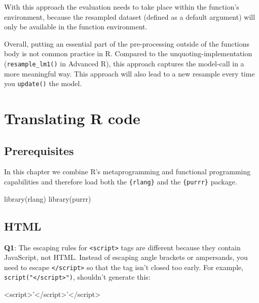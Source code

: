\documentclass[
]{krantz}
\makeatletter
\newenvironment{Shaded}{\begin{snugshade}}{\end{snugshade}}
\newcommand{\KeywordTok}[1]{\textcolor[rgb]{0.13,0.29,0.53}{\textbf{#1}}}
\newcommand{\NormalTok}[1]{#1}
\newcommand{\StringTok}[1]{\textcolor[rgb]{0.31,0.60,0.02}{#1}}
\newenvironment{kframe}{%
\medskip{}
\setlength{\fboxsep}{.8em}
 \def\at@end@of@kframe{}%
 \ifinner\ifhmode%
  \def\at@end@of@kframe{\end{minipage}}%
  \begin{minipage}{\columnwidth}%
 \fi\fi%
 \def\FrameCommand##1{\hskip\@totalleftmargin \hskip-\fboxsep
 \colorbox{shadecolor}{##1}\hskip-\fboxsep
     \hskip-\linewidth \hskip-\@totalleftmargin \hskip\columnwidth}%
 \MakeFramed {\advance\hsize-\width
   \@totalleftmargin\z@ \linewidth\hsize
   \@setminipage}}%
 {\par\unskip\endMakeFramed%
 \at@end@of@kframe}
\renewenvironment{Shaded}{\begin{kframe}}{\end{kframe}}
\renewcommand{\KeywordTok} [1]{\textcolor[rgb]{0.00,0.44,0.13}{{#1}}}
\renewcommand{\StringTok}  [1]{\textcolor[rgb]{0.25,0.44,0.63}{{#1}}}
\renewcommand{\NormalTok}  [1]{{#1}}
\makeatother
\begin{document}
With this approach the evaluation needs to take place within the function's environment, because the resampled dataset (defined as a default argument) will only be available in the function environment.

Overall, putting an essential part of the pre-processing outside of the functions body is not common practice in R. Compared to the unquoting-implementation (\texttt{resample\_lm1()} in Advanced R), this approach captures the model-call in a more meaningful way. This approach will also lead to a new resample every time you \texttt{update()} the model.

\hypertarget{translating-r-code}{%
\chapter{Translating R code}\label{translating-r-code}}

\hypertarget{prerequisites-12}{%
\section*{Prerequisites}\label{prerequisites-12}}


In this chapter we combine R's metaprogramming and functional programming capabilities and therefore load both the \texttt{\{rlang\}} and the \texttt{\{purrr\}} package.

\begin{Shaded}
\begin{Highlighting}[]
\KeywordTok{library}\NormalTok{(rlang)}
\KeywordTok{library}\NormalTok{(purrr)}
\end{Highlighting}
\end{Shaded}


\hypertarget{html}{%
\section{HTML}\label{html}}

\textbf{{Q1}}: The escaping rules for \texttt{\textless{}script\textgreater{}} tags are different because they contain JavaScript, not HTML. Instead of escaping angle brackets or ampersands, you need to escape \texttt{\textless{}/script\textgreater{}} so that the tag isn't closed too early. For example, \texttt{script("\textquotesingle{}\textless{}/script\textgreater{}\textquotesingle{}")}, shouldn't generate this:

\begin{Shaded}
\begin{Highlighting}[]
\KeywordTok{<script>}\StringTok{'</script>'}\KeywordTok{</script>}
\end{Highlighting}
\end{Shaded}
\end{document}
